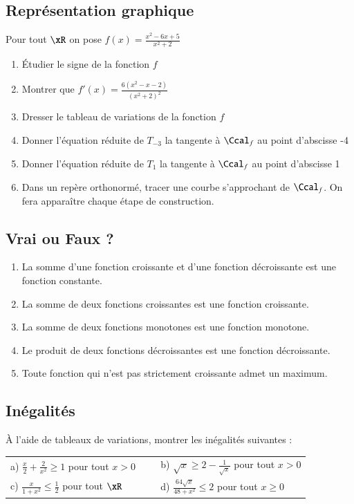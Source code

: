 \documentclass[oneside,12pt]{article}          %
\begin{document}
\subsection{Représentation graphique}
Pour tout $\xR$ on pose $f(x)=\frac{x^2-6x+5}{x^2+2}$
\begin{enumerate}
	\item Étudier le signe de la fonction $f$
	\item Montrer que $f'(x)=\frac{6(x^2-x-2)}{(x^2+2)^2}$
	\item Dresser le tableau de variations de la fonction $f$
	\item Donner l'équation réduite de $T_{-3}$ la tangente à $\Ccal_f$ au point d'abscisse -4
	\item Donner l'équation réduite de $T_1$ la tangente à $\Ccal_f$ au point d'abscisse 1
	\item Dans un repère orthonormé, tracer une courbe s'approchant de $\Ccal_f$. On fera apparaître chaque étape de construction.
\end{enumerate}



\subsection{Vrai ou Faux ?}
\begin{enumerate}
	\item La somme d'une fonction croissante et d'une fonction décroissante est une fonction constante.
	\item La somme de deux fonctions croissantes est une fonction croissante.
	\item La somme de deux fonctions monotones est une fonction monotone.
	\item Le produit de deux fonctions décroissantes est une fonction décroissante.
	\item Toute fonction qui n'est pas strictement croissante admet un maximum.
\end{enumerate}



\subsection{Inégalités}
À l'aide de tableaux de variations, montrer les inégalités suivantes :

\begin{tabular}{p{0.5\linewidth} p{0.5\linewidth}}
    a) $\frac{x}{2}+\frac{2}{x^2}\geq1$ \quad pour tout $x>0$ &
    
    b) $\sqrt{x} \geq 2 -\frac{1}{\sqrt{x}}$ \quad pour tout $x>0$ \\
    
    c) $\frac{x}{1+x^2}\leq\frac{1}{2}$ \quad pour tout $\xR$ &
    
    d) $\frac{64\sqrt{x}}{48+x^2}\leq 2$ \quad pour tout $x\geq0$ \\
\end{tabular}
\end{document}
